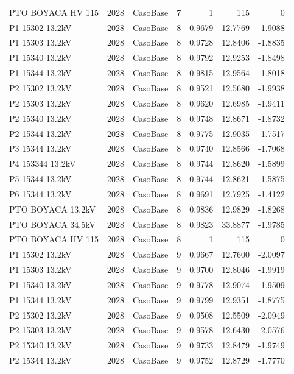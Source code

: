 \documentclass[11pt,a4paper]{article}
\begin{document}
\begin{longtable}{llllrrr}
PTO BOYACA HV 115 & 2028 & CasoBase & 7 & 1 & 115 & 0 \\
P1 15302 13.2kV & 2028 & CasoBase & 8 & 0.9679 & 12.7769 & -1.9088 \\
P1 15303 13.2kV & 2028 & CasoBase & 8 & 0.9728 & 12.8406 & -1.8835 \\
P1 15340 13.2kV & 2028 & CasoBase & 8 & 0.9792 & 12.9253 & -1.8498 \\
P1 15344 13.2kV & 2028 & CasoBase & 8 & 0.9815 & 12.9564 & -1.8018 \\
P2 15302 13.2kV & 2028 & CasoBase & 8 & 0.9521 & 12.5680 & -1.9938 \\
P2 15303 13.2kV & 2028 & CasoBase & 8 & 0.9620 & 12.6985 & -1.9411 \\
P2 15340 13.2kV & 2028 & CasoBase & 8 & 0.9748 & 12.8671 & -1.8732 \\
P2 15344 13.2kV & 2028 & CasoBase & 8 & 0.9775 & 12.9035 & -1.7517 \\
P3 15344 13.2kV & 2028 & CasoBase & 8 & 0.9740 & 12.8566 & -1.7068 \\
P4 153344 13.2kV & 2028 & CasoBase & 8 & 0.9744 & 12.8620 & -1.5899 \\
P5 15344 13.2kV & 2028 & CasoBase & 8 & 0.9744 & 12.8621 & -1.5875 \\
P6 15344 13.2kV & 2028 & CasoBase & 8 & 0.9691 & 12.7925 & -1.4122 \\
PTO BOYACA 13.2kV & 2028 & CasoBase & 8 & 0.9836 & 12.9829 & -1.8268 \\
PTO BOYACA 34.5kV & 2028 & CasoBase & 8 & 0.9823 & 33.8877 & -1.9785 \\
PTO BOYACA HV 115 & 2028 & CasoBase & 8 & 1 & 115 & 0 \\
P1 15302 13.2kV & 2028 & CasoBase & 9 & 0.9667 & 12.7600 & -2.0097 \\
P1 15303 13.2kV & 2028 & CasoBase & 9 & 0.9700 & 12.8046 & -1.9919 \\
P1 15340 13.2kV & 2028 & CasoBase & 9 & 0.9778 & 12.9074 & -1.9509 \\
P1 15344 13.2kV & 2028 & CasoBase & 9 & 0.9799 & 12.9351 & -1.8775 \\
P2 15302 13.2kV & 2028 & CasoBase & 9 & 0.9508 & 12.5509 & -2.0949 \\
P2 15303 13.2kV & 2028 & CasoBase & 9 & 0.9578 & 12.6430 & -2.0576 \\
P2 15340 13.2kV & 2028 & CasoBase & 9 & 0.9733 & 12.8479 & -1.9749 \\
P2 15344 13.2kV & 2028 & CasoBase & 9 & 0.9752 & 12.8729 & -1.7770 \\

\end{longtable}
\end{document}
